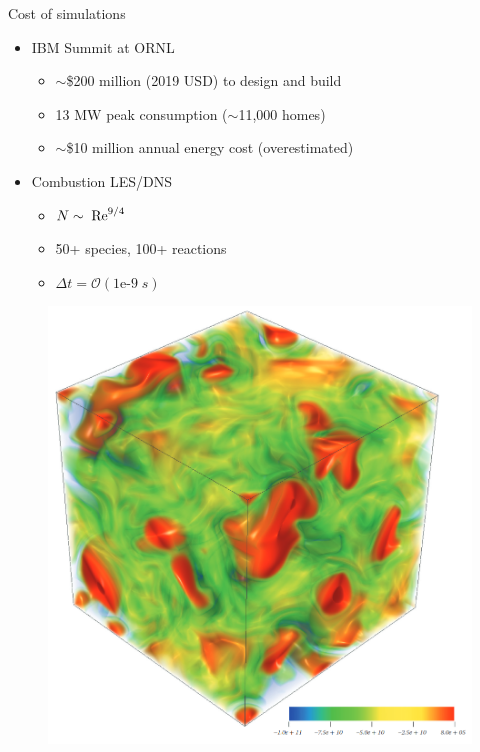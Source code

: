 \documentclass[]{beamer}
\begin{document}
\begin{frame}{Cost of simulations}
    \begin{itemize}
        \item IBM Summit at ORNL
        \begin{itemize}
            \item $\sim$\$200 million (2019 USD) to design and build
            \item 13 MW peak consumption ($\sim$11,000 homes)
            \item $\sim$\$10 million annual energy cost (overestimated)
        \end{itemize}
        \item Combustion LES/DNS
        \begin{itemize}
            \item $N \sim \; \text{Re}^{9/4}$
            \item 50+ species, 100+ reactions
            \item $\Delta t = \mathcal{O}(1\text{e-}9 \; s)$
        \end{itemize}
    \end{itemize}
	\centering
	\begin{minipage}{0.3\linewidth}
		\centering
		\begin{figure}
			\centering
			\includegraphics[width=0.95\linewidth]{combustionDNS.png}

\end{figure}
\end{minipage}
\end{frame}
\end{document}
